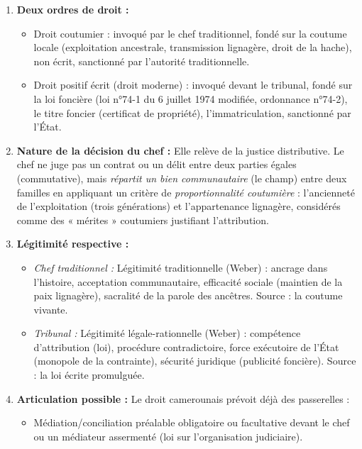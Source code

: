 \documentclass[11pt]{article}
\newcommand{\cle}[1]{{\popxbold\color{popdark}#1}}
\begin{document}
\begin{corrige}
\begin{enumerate}
\item \textbf{Deux ordres de droit :}
      \begin{itemize}
      \item \cle{Droit coutumier} : invoqué par le chef traditionnel, fondé sur la coutume locale (exploitation ancestrale, transmission lignagère, droit de la hache), non écrit, sanctionné par l'autorité traditionnelle.
      \item \cle{Droit positif écrit (droit moderne)} : invoqué devant le tribunal, fondé sur la loi foncière (loi n°74-1 du 6 juillet 1974 modifiée, ordonnance n°74-2), le titre foncier (certificat de propriété), l'immatriculation, sanctionné par l'État.
      \end{itemize}
\item \textbf{Nature de la décision du chef :} Elle relève de la \cle{justice distributive}. Le chef ne juge pas un contrat ou un délit entre deux parties égales (commutative), mais \emph{répartit un bien communautaire} (le champ) entre deux familles en appliquant un critère de \emph{proportionnalité coutumière} : l'ancienneté de l'exploitation (trois générations) et l'appartenance lignagère, considérés comme des « mérites » coutumiers justifiant l'attribution.
\item \textbf{Légitimité respective :}
      \begin{itemize}
      \item \emph{Chef traditionnel :} Légitimité \cle{traditionnelle} (Weber) : ancrage dans l'histoire, acceptation communautaire, efficacité sociale (maintien de la paix lignagère), sacralité de la parole des ancêtres. Source : la coutume vivante.
      \item \emph{Tribunal :} Légitimité \cle{légale-rationnelle} (Weber) : compétence d'attribution (loi), procédure contradictoire, force exécutoire de l'État (monopole de la contrainte), sécurité juridique (publicité foncière). Source : la loi écrite promulguée.
      \end{itemize}
\item \textbf{Articulation possible :} Le droit camerounais prévoit déjà des passerelles :
      \begin{itemize}
      \item \cle{Médiation/conciliation préalable} obligatoire ou facultative devant le chef ou un médiateur assermenté (loi sur l'organisation judiciaire).

\end{itemize}
\end{enumerate}
\end{corrige}
\end{document}
